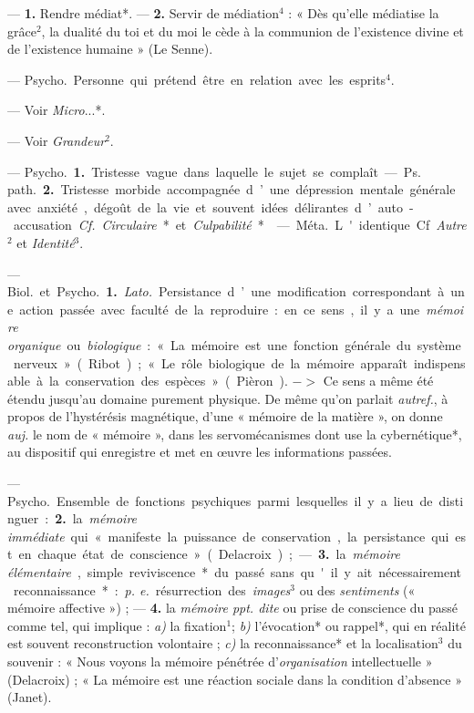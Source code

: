 \begin{itemize}[leftmargin=1cm, label=, itemsep=1pt]
 — {\bf 1.} Rendre médiat*. —  {\bf 2.} Servir de
médiation$^4$ : « Dès
qu'elle médiatise la grâce$^2$, la dualité du toi et du moi le cède à la
communion de l'existence divine et de l’existence humaine » (Le Senne).

 — \si{Psycho.} Personne qui prétend être en relation avec les
esprits$^4$.

 — Voir {\it Micro}...*.

 — Voir {\it Grandeur}$^2$.

 — \si{Psycho.} {\bf 1.} Tristesse vague dans laquelle le
sujet se complaît. — \si{Ps. path.} {\bf 2.} Tristesse morbide accompagnée
d’une dépression mentale générale avec anxiété, dégoût de la vie et souvent
idées délirantes d’auto-accusation. {\it Cf.} {\it Circulaire}* et
{\it Culpabilité}*.

 — \si{Méta.} L'identique. Cf. {\it Autre}$^2$ et
{\it Identité}$^3$.

 — \si{Biol.} et \si{Psycho.} {\bf 1.} {\it Lato.} Persistance d’une
modification correspondant à une action passée avec faculté de la
reproduire : en ce sens, il y a une {\it mémoire organique} ou
{\it biologique} : « La mémoire est une fonction générale du système
nerveux » (Ribot) ; « Le rôle biologique de la mémoire apparaît indispensable
à la conservation des espèces » (Pièron). $->$ Ce sens a même été étendu
jusqu’au domaine purement physique. De même qu’on parlait {\it autref.}, à
propos de l'hystérésis magnétique, d’une « mémoire de la matière », on donne
{\it auj.} le nom de « mémoire », dans les servomécanismes dont use la
cybernétique*, au dispositif qui enregistre et met en œuvre les informations
passées.

— \si{Psycho.} Ensemble de fonctions psychiques parmi lesquelles il y a lieu
de distinguer : {\bf 2.} la {\it mémoire immédiate} qui « manifeste la
puissance de conservation, la persistance qui
est en chaque état de conscience » (Delacroix) ; — {\bf 3.} la {\it mémoire
élémentaire}, simple reviviscence* du passé sans qu'il y ait nécessairement
reconnaissance* : {\it p. e.} résurrection des {\it images}$^3$ ou des
{\it sentiments} (« mémoire affective ») ; — {\bf 4.} la {\it mémoire ppt.
dite} ou prise de conscience du passé comme tel, qui implique : {\it a)} la
fixation$^1$; {\it b)} l’évocation* ou rappel*, qui en réalité est souvent
reconstruction volontaire ; {\it c)} la reconnaissance* et la localisation$^3$
du souvenir : « Nous voyons la mémoire pénétrée d'{\it organisation}
intellectuelle » (Delacroix) ; « La mémoire est une réaction sociale dans la
condition d'absence » (Janet).


\end{itemize}
